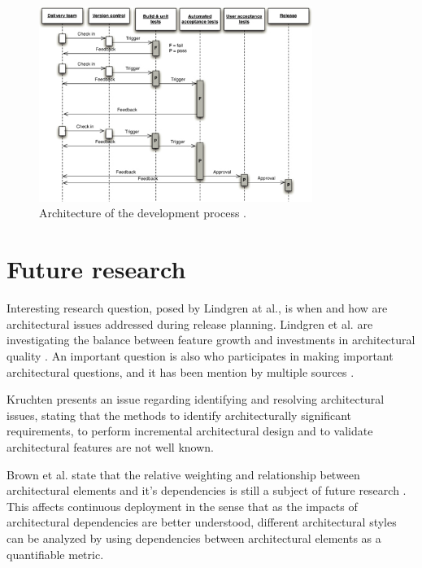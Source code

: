 \documentclass[conference]{IEEEtran}
\begin{document}
\begin{figure}[!t]
	\centering
	\includegraphics[width=3.5in]{developmentprocess.jpg}
	\caption{Architecture of the development process \cite{cdbook}.}
	\label{fig2}
\end{figure}

\section{Future research}

Interesting research question, posed by Lindgren at al., is when and how are architectural issues addressed during release planning. Lindgren et al. are investigating the balance between feature growth and investments in architectural quality \cite{lindgren2008importance}. An important question is also who participates in making important architectural questions, and it has been mention by multiple sources \cite{lindgren2008importance, kruchten2010software}.

Kruchten presents an issue regarding identifying and resolving architectural issues, stating that the methods to identify architecturally significant requirements, to perform incremental architectural design and to validate architectural features are not well known.

Brown et al. state that the relative weighting and relationship between architectural elements and it's dependencies is still a subject of future research \cite{brown2011analysis}. This affects continuous deployment in the sense that as the impacts of architectural dependencies are better understood, different architectural styles can be analyzed by using dependencies between architectural elements as a quantifiable metric. 


\end{document}

